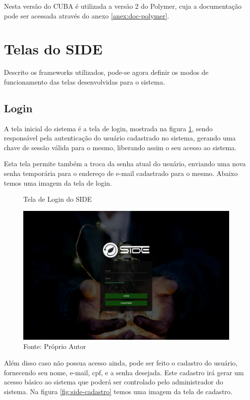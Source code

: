 Nesta versão do CUBA é utilizada a versão 2 do Polymer, cuja a documentação pode ser acessada através do anexo \ref{anex:doc-polymer}.

\section{Telas do SIDE}

Descrito os frameworks utilizados, pode-se agora definir os modos de funcionamento das telas desenvolvidas para o sistema. 

\subsection{Login}

A tela inicial do sistema é a tela de login, mostrada na figura \ref{fig:side-login}, sendo responsável pela autenticação do usuário cadastrado no sistema, gerando uma chave de sessão válida para o mesmo, liberando assim o seu acesso ao sistema.

Esta tela permite também a troca da senha atual do usuário, enviando uma nova senha temporária para o endereço de e-mail cadastrado para o mesmo. Abaixo temos uma imagem da tela de login.

\begin{figure}[H]
    \centering
    \caption{Tela de Login do SIDE}
\includegraphics[width=\linewidth]{imagens/side/side-login.png}
    \caption*{Fonte: Próprio Autor}
    \label{fig:side-login}
\end{figure}

Além disso caso não possua acesso ainda, pode ser feito o cadastro do usuário, fornecendo seu nome, e-mail, cpf, e a senha desejada. Este cadastro irá gerar um acesso básico ao sistema que poderá ser controlado pelo administrador do sistema. Na figura \ref{fig:side-cadastro} temos uma imagem da tela de cadastro.

